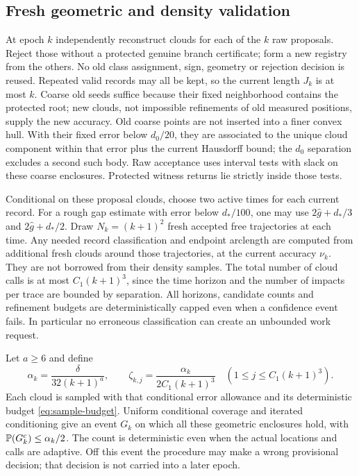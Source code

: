 \subsection{Fresh geometric and density validation}
At epoch $k$ independently reconstruct clouds for each of the $k$ raw
proposals. Reject those without a protected genuine branch certificate;
form a new registry from the others. No old class assignment, sign,
geometry or rejection decision is reused. Repeated valid records may all
be kept, so the current length $J_k$ is at most $k$. Coarse old seeds
suffice because their fixed neighborhood contains the protected root;
new clouds, not impossible refinements of old measured positions, supply
the new accuracy. Old coarse points are not inserted into a finer convex
hull. With their fixed error below $d_0/20$, they are associated to the
unique cloud component within that error plus the current Hausdorff bound;
the $d_0$ separation excludes a second such body. Raw acceptance uses
interval tests with slack on these coarse enclosures. Protected witness
returns lie strictly inside those tests.

Conditional on these proposal clouds, choose two active times for each
current record. For a rough gap estimate with error below $d_*/100$, one
may use $2\widehat g+d_*/3$ and $2\widehat g+d_*/2$. Draw
$N_k=(k+1)^2$ fresh accepted free trajectories at each time. Any needed
record classification and endpoint arclength are computed from additional
fresh clouds around those trajectories, at the current accuracy $\nu_k$.
They are not borrowed from their density samples. The total number of
cloud calls is at most $C_1(k+1)^3$, since the time horizon and the number
of impacts per trace are bounded by separation. All horizons, candidate
counts and refinement budgets are deterministically capped even when
a confidence event fails. In particular no erroneous classification
can create an unbounded work request.

Let $a\ge6$ and define
\begin{equation}\label{eq:spending}
 \alpha_k=\frac{\delta}{32(k+1)^a},\qquad
 \zeta_{k,j}=\frac{\alpha_k}{2C_1(k+1)^3}
       \quad(1\le j\le C_1(k+1)^3).
\end{equation}
Each cloud is sampled with that conditional error allowance and its
deterministic budget \eqref{eq:sample-budget}. Uniform conditional
coverage and iterated conditioning give an event $G_k$ on which all
these geometric enclosures hold, with $\mathbb P(G_k^c)\le\alpha_k/2$.
The count is deterministic even when the actual locations and calls are
adaptive. Off this event the procedure may make a wrong provisional
decision; that decision is not carried into a later epoch.

